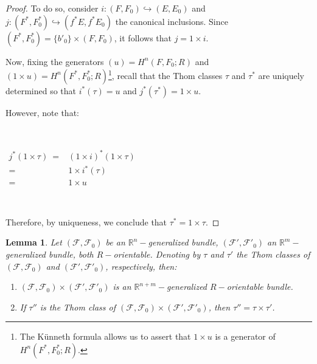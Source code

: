 \documentclass[12pt,oneside]{book}
\newtheorem{lem}    {Lemma}[chapter]
\newcommand{\R}{\mathbb{R}}
\begin{document}
\begin{proof}
        To do so, consider $i:(F,F_{0})\hookrightarrow (E,E_{0})$ and $j:(F^{*},F^{*}_{0})\hookrightarrow (f^{*}E,f^{*}E_{0})$ the canonical 
        inclusions. Since $(F^{*},F^{*}_{0})=\{ b'_{0} \}\times (F,F_{0})$, it follows that $j=1\times i$.

        Now, fixing the generators $(u)=H^{n}(F,F_{0};R)$ and 
        $(1\times u)=H^{n}(F^{*},F^{*}_{0};R)$\footnote{The Künneth formula allows us to assert that 
        $1\times u$ is a generator of $H^{n}(F^{*},F^{*}_{0};R)$.}, recall that the Thom classes $\tau$ and $\tau^{*}$ are uniquely 
        determined so that $i^{*}(\tau)=u$ and $j^{*}(\tau^{*})=1\times u$.

        However, note that:

        \

        $\begin{array}{rl}
        	j^{*}(1\times \tau) \ = & (1\times i)^{*}(1\times \tau) \\
        	= & 1\times i^{*}(\tau) \\
        	= & 1\times u
        \end{array}$

        \

        Therefore, by uniqueness, we conclude that $\tau^{*}=1\times \tau$.

    \end{proof}

    \begin{lem}\label{lema_thom_3}
	    Let $(\mathcal{F},\mathcal{F}_{0})$ be an $\R^{n}-$generalized bundle, 
        $(\mathcal{F'},\mathcal{F'}_{0})$ an $\R^{m}-$generalized bundle, both $R-$orientable. Denoting by $\tau$ and $\tau'$ 
        the Thom classes of $(\mathcal{F},\mathcal{F}_{0})$ and $(\mathcal{F'},\mathcal{F'}_{0})$, respectively, then:
	\begin{enumerate}
		\item $(\mathcal{F},\mathcal{F}_{0})\times (\mathcal{F'},\mathcal{F'}_{0})$ is an $\R^{n+m}-$generalized $R-$orientable bundle.
		\item If $\tau''$ is the Thom class of $(\mathcal{F},\mathcal{F}_{0})\times (\mathcal{F'},\mathcal{F'}_{0})$, 
        then $\tau''=\tau\times\tau'$.
	\end{enumerate}
    \end{lem}
\end{document}

